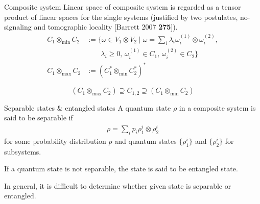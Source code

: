 \documentclass[10pt]{beamer}
\newcommand\emm[1]{\textcolor{redorange}{{#1}}}
\newcommand\numc[1]{\textcolor{citation}{{\bf #1}}}
\begin{document}
\begin{frame}{Composite system}
Linear space of composite system is regarded as a \emm{tensor product} of linear spaces for the single systems
(justified by two postulates, no-signaling and tomographic locality [Barrett 2007 \numc{275}]).
\begin{align*}
C_1 \otimes_{\min} C_2
&:=\Bigg\{\omega \in V_1\otimes V_2 \mid \omega = \sum_i \lambda_i \omega^{(1)}_i\otimes \omega^{(2)}_i,\\
&\qquad \lambda_i \ge 0,\, \omega^{(1)}_i \in C_1,\, \omega^{(2)}_i \in C_2\Bigg\}\\
C_1 \otimes_{\max} C_2
&:=(C^*_1 \otimes_{\min} C^*_2 )^*
\end{align*}

\vspace{2em}
\begin{equation*}
(C_1 \otimes_{\max} C_2)
\supseteq
C_{1,2}\supseteq
(C_1 \otimes_{\min} C_2)
\end{equation*}
\end{frame}
\fi



\begin{frame}{Separable states \& entangled states}
A quantum state $\rho$ in a composite system is said to be \emm{separable} if
\begin{align*}
\rho = \sum_{i}p_i \rho_1^i \otimes \rho_2^i
\end{align*}
for some probability distribution $p$ and quantum states $\{\rho_1^i\}$ and $\{\rho_2^i\}$ for subsystems.

\vspace{2em}
If a quantum state is not separable, the state is said to be \emm{entangled} state.

\vspace{2em}
In general, it is difficult to determine whether given state is separable or entangled.
\end{frame}
\end{document}
